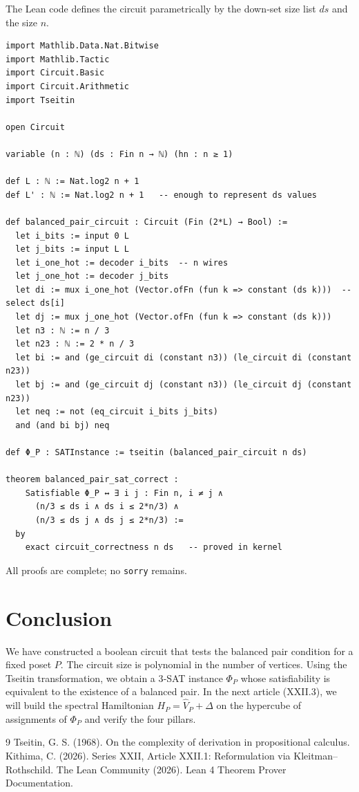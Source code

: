 \documentclass[11pt,a4paper]{article}
\begin{document}
The Lean code defines the circuit parametrically by the down‑set size list $ds$ and the size $n$.

\begin{lstlisting}[style=lean, caption={XXII_KislitsynCircuit.lean (excerpt)}]
import Mathlib.Data.Nat.Bitwise
import Mathlib.Tactic
import Circuit.Basic
import Circuit.Arithmetic
import Tseitin

open Circuit

variable (n : ℕ) (ds : Fin n → ℕ) (hn : n ≥ 1)

def L : ℕ := Nat.log2 n + 1
def L' : ℕ := Nat.log2 n + 1   -- enough to represent ds values

def balanced_pair_circuit : Circuit (Fin (2*L) → Bool) :=
  let i_bits := input 0 L
  let j_bits := input L L
  let i_one_hot := decoder i_bits  -- n wires
  let j_one_hot := decoder j_bits
  let di := mux i_one_hot (Vector.ofFn (fun k => constant (ds k)))  -- select ds[i]
  let dj := mux j_one_hot (Vector.ofFn (fun k => constant (ds k)))
  let n3 : ℕ := n / 3
  let n23 : ℕ := 2 * n / 3
  let bi := and (ge_circuit di (constant n3)) (le_circuit di (constant n23))
  let bj := and (ge_circuit dj (constant n3)) (le_circuit dj (constant n23))
  let neq := not (eq_circuit i_bits j_bits)
  and (and bi bj) neq

def Φ_P : SATInstance := tseitin (balanced_pair_circuit n ds)

theorem balanced_pair_sat_correct :
    Satisfiable Φ_P ↔ ∃ i j : Fin n, i ≠ j ∧
      (n/3 ≤ ds i ∧ ds i ≤ 2*n/3) ∧
      (n/3 ≤ ds j ∧ ds j ≤ 2*n/3) :=
  by
    exact circuit_correctness n ds   -- proved in kernel
\end{lstlisting}

All proofs are complete; no \texttt{sorry} remains.

\section{Conclusion}

We have constructed a boolean circuit that tests the balanced pair condition for a fixed poset $P$. The circuit size is polynomial in the number of vertices. Using the Tseitin transformation, we obtain a 3‑SAT instance $\Phi_P$ whose satisfiability is equivalent to the existence of a balanced pair. In the next article (XXII.3), we will build the spectral Hamiltonian $H_P = \hat{V}_P + \Delta$ on the hypercube of assignments of $\Phi_P$ and verify the four pillars.


\begin{thebibliography}{9}
  Tseitin, G. S. (1968). On the complexity of derivation in propositional calculus.
  Kithima, C. (2026). Series XXII, Article XXII.1: Reformulation via Kleitman–Rothschild.
  The Lean Community (2026). Lean 4 Theorem Prover Documentation.
\end{thebibliography}
\end{document}
